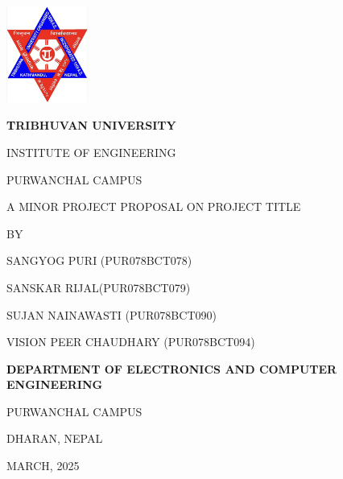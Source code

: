 \begin{titlepage}
    \centering
    
    \includegraphics[width=0.2\textwidth]{Graphics/TULogo.png}\par
    \vspace{1.2cm}
    {\fontsize{14pt}{12pt}\selectfont\bfseries\textcolor{black}
    TRIBHUVAN UNIVERSITY \par INSTITUTE OF ENGINEERING \par PURWANCHAL CAMPUS \par
    \vspace{1.2cm}
    \begin{flushleft}
    
    \end{flushleft}

    \par A MINOR PROJECT PROPOSAL ON PROJECT TITLE \par

    \vspace{1.2cm}
    BY\par SANGYOG PURI (PUR078BCT078)
      \par SANSKAR RIJAL(PUR078BCT079)
      \par SUJAN NAINAWASTI (PUR078BCT090)
      \par VISION PEER CHAUDHARY (PUR078BCT094)
    \par
    \vspace{1.2cm}\par
    }
    {\fontsize{13pt}{12pt}\selectfont\bfseries\textcolor{black}
    DEPARTMENT OF ELECTRONICS AND COMPUTER ENGINEERING\par PURWANCHAL CAMPUS\par DHARAN, NEPAL\par
    \vspace{1.2cm}
    \vspace{1.2cm}
    
    MARCH, 2025 
    }
\end{titlepage}

